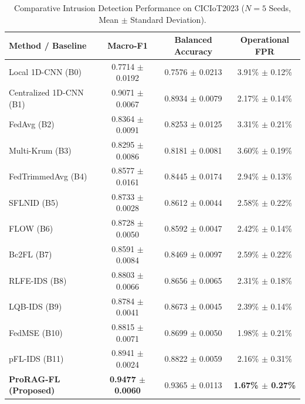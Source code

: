 \begin{table}[t]
\centering
\small
\caption{Comparative Intrusion Detection Performance on CICIoT2023 ($N=5$ Seeds, Mean $\pm$ Standard Deviation).}
\label{tab:main_ids_performance}
\begin{tabular}{lccc}
\toprule
\textbf{Method / Baseline} & \textbf{Macro-F1} & \textbf{Balanced Accuracy} & \textbf{Operational FPR} \\
\midrule
Local 1D-CNN (B0) & 0.7714 $\pm$ 0.0192 & 0.7576 $\pm$ 0.0213 & 3.91\% $\pm$ 0.12\% \\
Centralized 1D-CNN (B1) & 0.9071 $\pm$ 0.0067 & 0.8934 $\pm$ 0.0079 & 2.17\% $\pm$ 0.14\% \\
FedAvg (B2) & 0.8364 $\pm$ 0.0091 & 0.8253 $\pm$ 0.0125 & 3.31\% $\pm$ 0.21\% \\
Multi-Krum (B3) & 0.8295 $\pm$ 0.0086 & 0.8181 $\pm$ 0.0081 & 3.60\% $\pm$ 0.19\% \\
FedTrimmedAvg (B4) & 0.8577 $\pm$ 0.0161 & 0.8445 $\pm$ 0.0174 & 2.94\% $\pm$ 0.13\% \\
SFLNID (B5) & 0.8733 $\pm$ 0.0028 & 0.8612 $\pm$ 0.0044 & 2.58\% $\pm$ 0.22\% \\
FLOW (B6) & 0.8728 $\pm$ 0.0050 & 0.8592 $\pm$ 0.0047 & 2.42\% $\pm$ 0.14\% \\
Bc2FL (B7) & 0.8591 $\pm$ 0.0084 & 0.8469 $\pm$ 0.0097 & 2.59\% $\pm$ 0.22\% \\
RLFE-IDS (B8) & 0.8803 $\pm$ 0.0066 & 0.8656 $\pm$ 0.0065 & 2.31\% $\pm$ 0.18\% \\
LQB-IDS (B9) & 0.8784 $\pm$ 0.0041 & 0.8673 $\pm$ 0.0045 & 2.39\% $\pm$ 0.14\% \\
FedMSE (B10) & 0.8815 $\pm$ 0.0071 & 0.8699 $\pm$ 0.0050 & 1.98\% $\pm$ 0.21\% \\
pFL-IDS (B11) & 0.8941 $\pm$ 0.0024 & 0.8822 $\pm$ 0.0059 & 2.16\% $\pm$ 0.31\% \\
\textbf{ProRAG-FL (Proposed)} & \textbf{0.9477 $\pm$ 0.0060} & 0.9365 $\pm$ 0.0113 & \textbf{1.67\% $\pm$ 0.27\%} \\
\bottomrule
\end{tabular}
\end{table}
